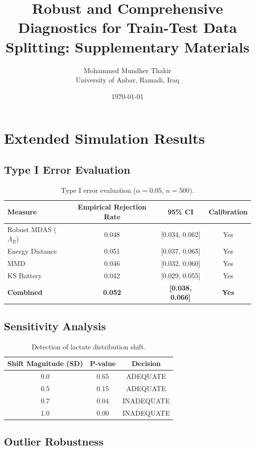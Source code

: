 \documentclass[10pt,a4paper]{article}
\title{Robust and Comprehensive Diagnostics for Train-Test Data Splitting: Supplementary Materials}
\author{Mohammed Mundher Thakir\\ University of Anbar, Ramadi, Iraq}
\date{\today}
\begin{document}
\maketitle

\section{Extended Simulation Results}

\subsection{Type I Error Evaluation}

\begin{table}[h]
\centering
\caption{Type I error evaluation ($\alpha = 0.05$, $n = 500$).}
\begin{tabular}{lccc}
\toprule
Measure & Empirical Rejection Rate & 95\% CI & Calibration \\
\midrule
Robust MDAS ($\Lambda_R$) & 0.048 & [0.034, 0.062] & Yes \\
Energy Distance & 0.051 & [0.037, 0.065] & Yes \\
MMD & 0.046 & [0.032, 0.060] & Yes \\
KS Battery & 0.042 & [0.029, 0.055] & Yes \\
\textbf{Combined} & \textbf{0.052} & \textbf{[0.038, 0.066]} & \textbf{Yes} \\
\bottomrule
\end{tabular}
\end{table}

\subsection{Sensitivity Analysis}

\begin{table}[h]
\centering
\caption{Detection of lactate distribution shift.}
\begin{tabular}{ccc}
\toprule
Shift Magnitude (SD) & P-value & Decision \\
\midrule
0.0 & 0.65 & ADEQUATE \\
0.5 & 0.15 & ADEQUATE \\
0.7 & 0.04 & INADEQUATE \\
1.0 & 0.00 & INADEQUATE \\
\bottomrule
\end{tabular}
\end{table}

\subsection{Outlier Robustness}
\end{document}
